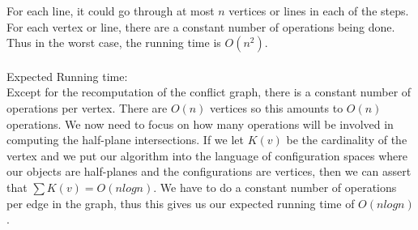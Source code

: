 \documentclass[11pt,psfig]{article}
\begin{document}
For each line, it could go through at most $n$ vertices or lines in each of the steps. \\
For each vertex or line, there are a constant number of operations being done. \\
Thus in the worst case, the running time is $O(n^2)$. \\
\\
Expected Running time:\\
Except for the recomputation of the conflict graph, there is a constant number of operations per vertex. There are $O(n)$ vertices so this amounts to $O(n)$ operations. We now need to focus on how many operations will be involved in computing the half-plane intersections. If we let $K(v)$ be the cardinality of the vertex and we put our algorithm into the language of configuration spaces where our objects are half-planes and the configurations are vertices, then we can assert that $\sum{K(v)} = O(n log n)$. We have to do a constant number of operations per edge in the graph, thus this gives us our expected running time of $O(n log n)$. 
\end{document}
